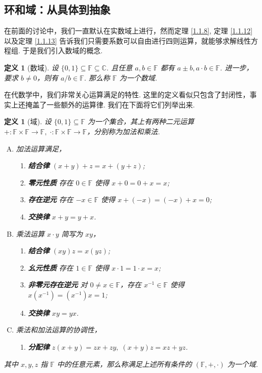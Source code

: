 \documentclass[10pt,openany]{article}
\theoremstyle{thmstyle} %
\theoremstyle{defstyle} %
\newtheorem{definition}[theorem]{定义}
\theoremstyle{prostyle} %
\begin{document}
\subsection{环和域：从具体到抽象}

在前面的讨论中，我们一直默认在实数域上进行，然而定理 \ref{1.1.8}, 定理 \ref{1.1.12} 以及定理 \ref{1.1.13} 告诉我们只需要系数可以自由进行四则运算，就能够求解线性方程组. 于是我们引入数域的概念.

\begin{definition}[数域]
	设 \( \{0,1\} \subseteq \mathbb{F} \subseteq \mathbb{C} \). 且任意 \( a,b \in \mathbb{F} \) 都有 \( a \pm b, a \cdot b \in \mathbb{F} \). 进一步，要求 \( b \neq 0 \)，则有 \( a/b \in \mathbb{F} \). 那么称 \( \mathbb{F} \) 为一个数域.
	\label{1.2.1}
\end{definition}

在代数学中，我们非常关心运算满足的特性. 这里的定义看似只包含了封闭性，事实上还掩盖了一些额外的运算律. 我们在下面将它们列举出来.

\begin{definition}[域]
	设 \( \{0,1\} \subseteq \mathbb{F} \) 为一个集合，其上有两种二元运算 \( +:\mathbb{F} \times \mathbb{F} \to \mathbb{F}, \; \cdot :\mathbb{F} \times \mathbb{F} \to \mathbb{F} \)，分别称为加法和乘法.
	\begin{enumerate}[(A)]
		\item 加法运算满足，
		\begin{enumerate}[(1)]
			\item \textbf{结合律} \( (x+y)+z=x+(y+z) \);
			\item \textbf{零元性质} 存在 \( 0 \in \mathbb{F} \) 使得 \( x+0=0+x=x \);
			\item \textbf{存在逆元} 存在 \( -x \in \mathbb{F} \) 使得 \( x+(-x)=(-x)+x=0 \);
			\item \textbf{交换律} \( x+y=y+x \).
		\end{enumerate}
		\item 乘法运算 \( x \cdot y \) 简写为 \( xy \)，
		\begin{enumerate}[(1)]
			\item \textbf{结合律} \( (xy)z=x(yz) \);
			\item \textbf{幺元性质} 存在 \( 1 \in \mathbb{F} \) 使得 \( x \cdot 1=1 \cdot x=x \);
			\item \textbf{非零元存在逆元} 对 \( 0 \neq x \in \mathbb{F} \)，存在 \( x^{-1} \in \mathbb{F} \) 使得 \( x(x^{-1})=(x^{-1})x=1 \);
			\item \textbf{交换律} \( xy=yx \).
		\end{enumerate}
		\item 乘法和加法运算的协调性，
		\begin{enumerate}[(1)]
			\item \textbf{分配律} \( z(x+y)=zx+zy, \; (x+y)z=xz+yz \).
		\end{enumerate}
	\end{enumerate}
	
	其中 \( x,y,z \) 指 \( \mathbb{F} \) 中的任意元素，那么称满足上述所有条件的 \( (\mathbb{F},+, \cdot) \) 为一个域.
	\label{1.2.2}
\end{definition}
\end{document}
